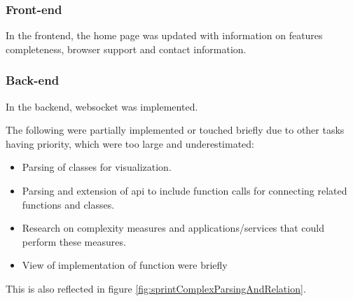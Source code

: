 \subsubsection{Front-end}
In the \gls{frontend}, the home page was updated with information on features completeness, browser support and contact information.

\subsubsection{Back-end}
In the \gls{backend}, \gls{websocket} was implemented.

The following were partially implemented or touched briefly due to other tasks having priority, which were too large and underestimated:
\begin{itemize}
    \item Parsing of classes for visualization.
    \item Parsing and extension of \gls{api} to include function calls for connecting related functions and classes.
    \item Research on complexity measures and applications/services that could perform these measures.
    \item View of implementation of function were briefly
\end{itemize}

This is also reflected in figure \ref{fig:sprintComplexParsingAndRelation}.


